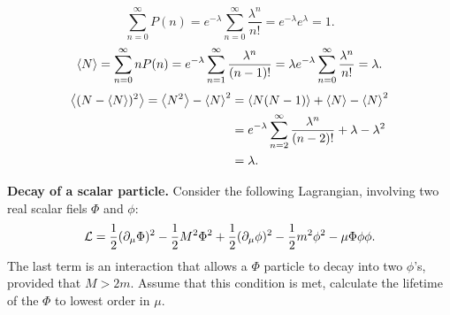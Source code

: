 \begin{problembody}
    \item \begin{equation*}
        \sum_{n = 0}^\infty P(n) 
        = e^{-\lambda} \sum_{n = 0}^\infty \frac{\lambda^n}{n!}
        = e^{-\lambda} e^{\lambda} = 1.
    \end{equation*}
    \begin{equation*}
        \left\langle N \right\rangle = \sum_{n = 0}^\infty nP(n)
        = e^{-\lambda} \sum_{n = 1}^\infty \frac{\lambda^n}{(n - 1)!}
        = \lambda e^{-\lambda} \sum_{n = 0}^\infty \frac{\lambda^n}{n!}
        = \lambda.
    \end{equation*}
    \begin{align*}
        \left\langle (N - \left\langle N \right\rangle)^2 \right\rangle = \left\langle N^2 \right\rangle - \left\langle N \right\rangle^2
        & = \left\langle N(N - 1) \right\rangle + \left\langle N \right\rangle - \left\langle N \right\rangle^2\\
        & = e^{-\lambda} \sum_{n = 2}^\infty \frac{\lambda^n}{(n - 2)!}
        + \lambda - \lambda^2\\
        & = \lambda.
    \end{align*}
\end{problembody}

\problem \textbf{Decay of a scalar particle.} Consider the following Lagrangian, involving two
real scalar fiels $\Phi$ and $\phi$:
\begin{equation*}
    \mathcal{L} = \frac{1}{2}(\partial_\mu\Phi)^2 - \frac{1}{2}M^2\Phi^2
    + \frac{1}{2}(\partial_\mu\phi)^2 - \frac{1}{2}m^2\phi^2
    - \mu\Phi\phi\phi.
\end{equation*}
The last term is an interaction that allows a $\Phi$ particle to decay into two $\phi$'s, provided
that $M > 2m$. Assume that this condition is met, calculate the lifetime of the $\Phi$ to lowest order
in $\mu$.

